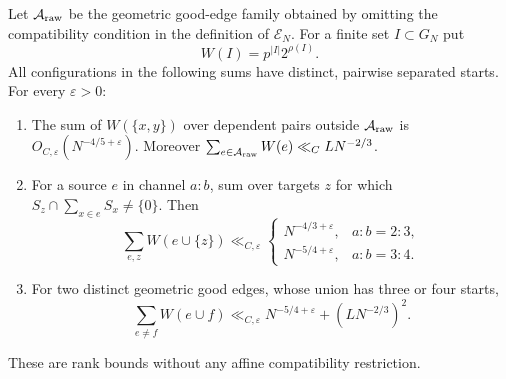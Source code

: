 \begin{proposition}
\label{p1:arith:fixed-homogeneous-seeds}
Let $\mathcal A_{\rm raw}$ be the geometric good-edge family obtained by
omitting the compatibility condition in the definition of $\mathcal E_N$.
For a finite set $I\subset G_N$ put
\[
 W(I)=p^{|I|}2^{\rho(I)}.
\]
All configurations in the following sums have distinct, pairwise separated
starts.  For every $\varepsilon>0$:
\begin{enumerate}
\item The sum of $W(\{x,y\})$ over dependent pairs outside
$\mathcal A_{\rm raw}$ is $O_{C,\varepsilon}(N^{-4/5+\varepsilon})$.
Moreover $\sum_{e\in\mathcal A_{\rm raw}}W(e)\ll_C LN^{-2/3}$.
\item For a source $e$ in channel $a:b$, sum over targets $z$ for which
$S_z\cap\sum_{x\in e}S_x\ne\{0\}$.  Then
\[
 \sum_{e,z}W(e\cup\{z\})
 \ll_{C,\varepsilon}
 \begin{cases}N^{-4/3+\varepsilon},&a:b=2:3,\\
               N^{-5/4+\varepsilon},&a:b=3:4.
 \end{cases}
\]
\item For two distinct geometric good edges, whose union has three or
four starts,
\[
 \sum_{e\ne f}W(e\cup f)
 \ll_{C,\varepsilon}N^{-5/4+\varepsilon}+(LN^{-2/3})^2.
\]
\end{enumerate}
These are rank bounds without any affine compatibility restriction.
\end{proposition}

